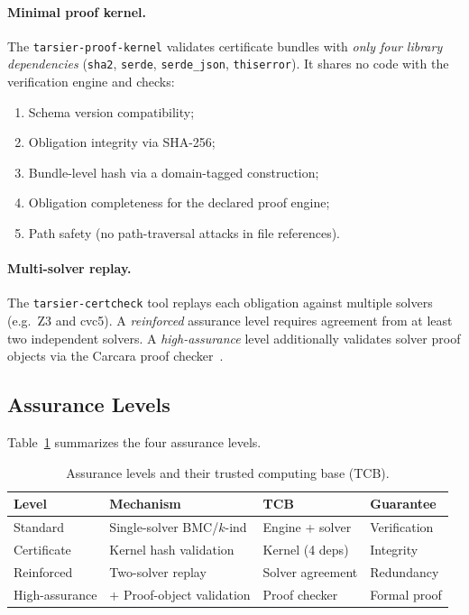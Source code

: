 \paragraph{Minimal proof kernel.}
The \texttt{tarsier-proof-kernel} validates certificate bundles with
\emph{only four library dependencies} (\texttt{sha2}, \texttt{serde},
\texttt{serde\_json}, \texttt{thiserror}).  It shares no code with the
verification engine and checks:
\begin{enumerate}
  \item Schema version compatibility;
  \item Obligation integrity via SHA-256;
  \item Bundle-level hash via a domain-tagged construction;
  \item Obligation completeness for the declared proof engine;
  \item Path safety (no path-traversal attacks in file references).
\end{enumerate}

\paragraph{Multi-solver replay.}
The \texttt{tarsier-certcheck} tool replays each obligation against
multiple solvers (e.g.\ Z3 and cvc5).  A \emph{reinforced} assurance
level requires agreement from at least two independent solvers.
A \emph{high-assurance} level additionally validates solver proof
objects via the Carcara proof checker~\cite{Carcara2023}.

\subsection{Assurance Levels}

Table~\ref{tab:assurance} summarizes the four assurance levels.

\begin{table}[t]
\centering
\caption{Assurance levels and their trusted computing base (TCB).}
\label{tab:assurance}
\begin{tabular}{@{}llll@{}}
\toprule
\textbf{Level} & \textbf{Mechanism} & \textbf{TCB} & \textbf{Guarantee} \\
\midrule
Standard       & Single-solver BMC/$k$-ind  & Engine + solver & Verification \\
Certificate    & Kernel hash validation     & Kernel (4 deps) & Integrity \\
Reinforced     & Two-solver replay          & Solver agreement & Redundancy \\
High-assurance & + Proof-object validation  & Proof checker   & Formal proof \\
\bottomrule
\end{tabular}
\end{table}
